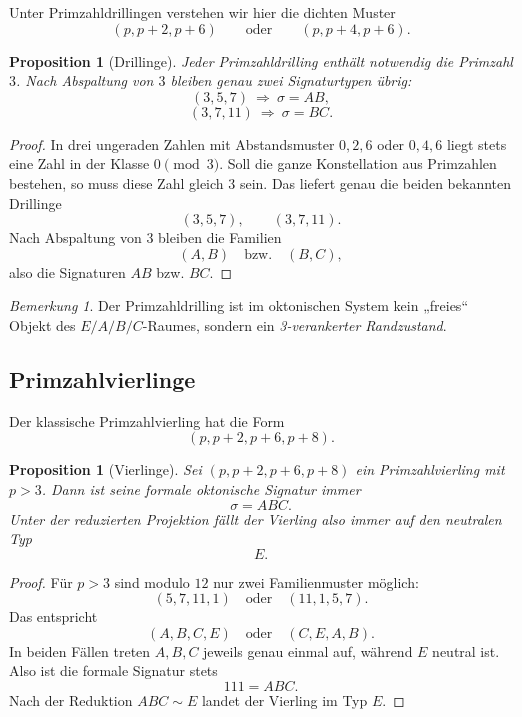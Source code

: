 \documentclass[11pt,a4paper]{article}
\newtheorem{proposition}[satz]{Proposition}
\theoremstyle{definition}
\theoremstyle{remark}
\newtheorem{bemerkung}[satz]{Bemerkung}
\newcommand{\sig}{\sigma}
\begin{document}
	Unter Primzahldrillingen verstehen wir hier die dichten Muster
	\[
	(p,p+2,p+6)\qquad\text{oder}\qquad (p,p+4,p+6).
	\]
	
	\begin{proposition}[Drillinge]
		Jeder Primzahldrilling enthält notwendig die Primzahl \(3\). Nach Abspaltung von \(3\)
		bleiben genau zwei Signaturtypen übrig:
		\[
		(3,5,7)\ \Longrightarrow\ \sig=AB,
		\]
		\[
		(3,7,11)\ \Longrightarrow\ \sig=BC.
		\]
	\end{proposition}
	
	\begin{proof}
		In drei ungeraden Zahlen mit Abstandsmuster \(0,2,6\) oder \(0,4,6\) liegt stets eine
		Zahl in der Klasse \(0 \pmod 3\). Soll die ganze Konstellation aus Primzahlen bestehen,
		so muss diese Zahl gleich \(3\) sein. Das liefert genau die beiden bekannten Drillinge
		\[
		(3,5,7),\qquad (3,7,11).
		\]
		Nach Abspaltung von \(3\) bleiben die Familien
		\[
		(A,B)\quad\text{bzw.}\quad (B,C),
		\]
		also die Signaturen \(AB\) bzw. \(BC\).
	\end{proof}
	
	\begin{bemerkung}
		Der Primzahldrilling ist im oktonischen System kein „freies“ Objekt des
		\(E/A/B/C\)-Raumes, sondern ein \emph{3-verankerter Randzustand}.
	\end{bemerkung}
	
	\subsection{Primzahlvierlinge}
	
	Der klassische Primzahlvierling hat die Form
	\[
	(p,p+2,p+6,p+8).
	\]
	
	\begin{proposition}[Vierlinge]
		Sei \((p,p+2,p+6,p+8)\) ein Primzahlvierling mit \(p>3\).
		Dann ist seine formale oktonische Signatur immer
		\[
		\sig = ABC.
		\]
		Unter der reduzierten Projektion fällt der Vierling also immer auf den neutralen Typ
		\[
		E.
		\]
	\end{proposition}
	
	\begin{proof}
		Für \(p>3\) sind modulo \(12\) nur zwei Familienmuster möglich:
		\[
		(5,7,11,1)\quad\text{oder}\quad (11,1,5,7).
		\]
		Das entspricht
		\[
		(A,B,C,E)\quad\text{oder}\quad (C,E,A,B).
		\]
		In beiden Fällen treten \(A,B,C\) jeweils genau einmal auf, während \(E\) neutral ist.
		Also ist die formale Signatur stets
		\[
		111=ABC.
		\]
		Nach der Reduktion \(ABC\sim E\) landet der Vierling im Typ \(E\).
	\end{proof}
	
\end{document}
